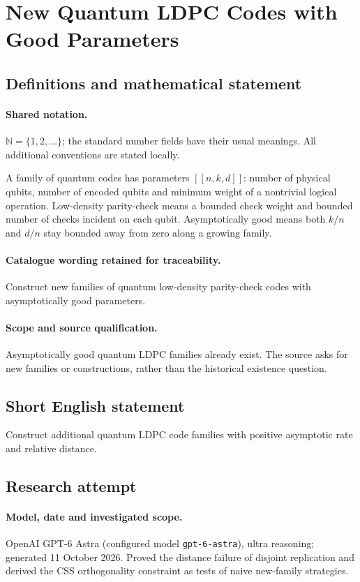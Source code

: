 \documentclass[11pt]{article}
\begin{document}
\section{New Quantum LDPC Codes with Good Parameters}\label{statement}

\subsection{Definitions and mathematical statement}

\paragraph{Shared notation.}$\mathbb N=\{1,2,\ldots\}$; the standard number fields have their usual meanings. All additional conventions are stated locally.


A family of quantum codes has parameters $[[n,k,d]]$: number of physical qubits, number of encoded qubits and minimum weight of a nontrivial logical operation. Low-density parity-check means a bounded check weight and bounded number of checks incident on each qubit. Asymptotically good means both $k/n$ and $d/n$ stay bounded away from zero along a growing family.

\paragraph{Catalogue wording retained for traceability.}
Construct new families of quantum low-density parity-check codes with asymptotically good parameters.

\paragraph{Scope and source qualification.}Asymptotically good quantum LDPC families already exist. The source asks for new families or constructions, rather than the historical existence question.
\subsection{Short English statement}
Construct additional quantum LDPC code families with positive asymptotic rate and relative distance.
\subsection{Research attempt}
\paragraph{Model, date and investigated scope.}
OpenAI GPT-6 Astra (configured model \texttt{gpt-6-astra}), ultra reasoning; generated 11 October 2026. Proved the distance failure of disjoint replication and derived the CSS orthogonality constraint as tests of naive new-family strategies.
\end{document}
